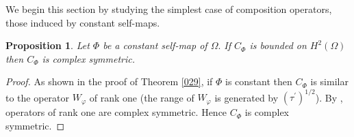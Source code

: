 \documentclass[11pt]{amsart}%
\newtheorem{pps}[thm]{Proposition}
\theoremstyle{definition}
\theoremstyle{remark}
\numberwithin{equation}{section}
\begin{document}
We begin this section by studying the simplest case of composition operators,
those induced by constant self-maps.

\begin{pps}
Let $\Phi$ be a constant self-map of $\Omega.$ If $C_{\Phi}$ is bounded on
$H^{2}(\Omega)$ then $C_{\Phi}$ is complex symmetric.
\end{pps}

\begin{proof}
As shown in the proof of Theorem \ref{029}, if $\Phi$ is constant then
$C_{\Phi}$ is similar to the operator $W_{\varphi}$ of rank one (the range of
$W_{\varphi}$ is generated by $(\tau^{\prime})^{1/2}$). By \cite[Theorem
2]{Wogen2}, operators of rank one are complex symmetric. Hence $C_{\Phi}$ is
complex symmetric.
\end{proof}

\end{document}
